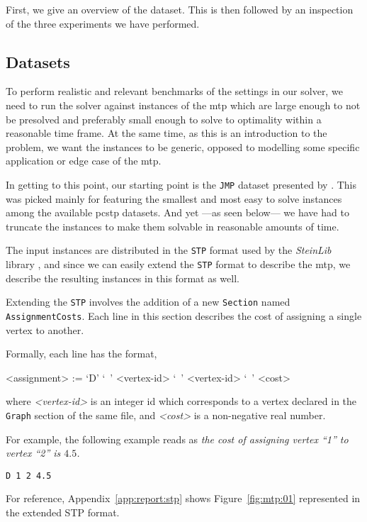 First, we give an overview of the dataset. This is then
followed by an inspection of the three experiments we have
 performed.
 \subsection{Datasets}
 To perform realistic and relevant benchmarks of the settings in our solver, we need to run the solver
 against instances of the \gls{mtp} which are large enough to not be presolved and preferably small
 enough to solve to optimality within a reasonable time frame. At the same time, as this is an introduction
 to the problem, we want the instances to be generic, opposed to modelling some specific application or
 edge case of the \gls{mtp}.

 In getting to this point, our starting point is the \texttt{JMP} dataset presented by 
 \citet{Johnson:2000:PCS:338219.338637}. This was picked mainly for featuring the smallest
 and most easy to solve instances among the available \gls{pcstp} datasets.
 And yet ---as seen below--- we have had to truncate the instances to make them solvable
 in reasonable amounts of time.

 The input instances are distributed in the \texttt{STP} format used by the \textit{SteinLib}
 library \citep{koch2001steinlib}, and since we can easily extend the \texttt{STP} format
 to describe the \gls{mtp}, we describe the resulting instances in this format as well.

 Extending the \texttt{STP} involves the addition of a new
 \texttt{Section} named \texttt{AssignmentCosts}. Each line
 in this section describes the cost of assigning a single vertex to another.

 Formally, each line has the format,
 \begin{grammar}
   <assignment> := `D' `\ ' <vertex-id> `\ ' <vertex-id> `\ ' <cost>
 \end{grammar}
 where \textit{<vertex-id>} is an integer id which corresponds to a vertex declared in the \texttt{Graph}
 section of the same file, and \textit{<cost>} is a non-negative real number.

 For example, the following example reads as \textit{the cost of assigning vertex ``1'' to vertex ``2'' is $4.5$.}
\begin{verbatim}
D 1 2 4.5
\end{verbatim}
 
 For reference, Appendix~\ref{app:report:stp} shows Figure~\ref{fig:mtp:01}
 represented in the extended STP format.

